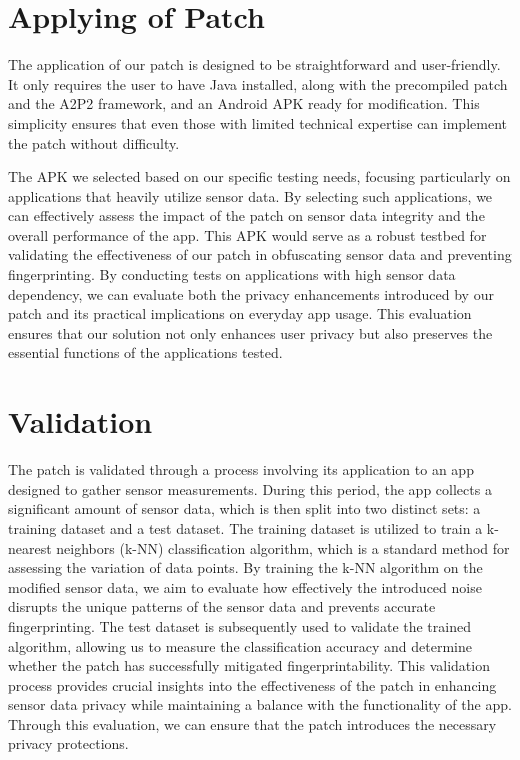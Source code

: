 \documentclass[11pt,
  oneside,openany,    %
]{scrreprt}
\begin{document}
\chapter{Applying of Patch}
\label{chap:applying}
The application of our patch is designed to be straightforward and user-friendly.
It only requires the user to have Java installed, along with the precompiled patch and the A2P2 framework, and an Android APK ready for modification.
This simplicity ensures that even those with limited technical expertise can implement the patch without difficulty.

The APK we selected based on our specific testing needs, focusing particularly on applications that heavily utilize sensor data.
By selecting such applications, we can effectively assess the impact of the patch on sensor data integrity and the overall performance of the app.
This APK would serve as a robust testbed for validating the effectiveness of our patch in obfuscating sensor data and preventing fingerprinting.
By conducting tests on applications with high sensor data dependency, we can evaluate both the privacy enhancements introduced by our patch and its practical implications on everyday app usage.
This evaluation ensures that our solution not only enhances user privacy but also preserves the essential functions of the applications tested.

\chapter{Validation}
\label{chap:validaton}
The patch is validated through a process involving its application to an app designed to gather sensor measurements.
During this period, the app collects a significant amount of sensor data, which is then split into two distinct sets: a training dataset and a test dataset.
The training dataset is utilized to train a k-nearest neighbors (k-NN) classification algorithm, which is a standard method for assessing the variation of data points.
By training the k-NN algorithm on the modified sensor data, we aim to evaluate how effectively the introduced noise disrupts the unique patterns of the sensor data and prevents accurate fingerprinting.
The test dataset is subsequently used to validate the trained algorithm, allowing us to measure the classification accuracy and determine whether the patch has successfully mitigated fingerprintability.
This validation process provides crucial insights into the effectiveness of the patch in enhancing sensor data privacy while maintaining a balance with the functionality of the app.
Through this evaluation, we can ensure that the patch introduces the necessary privacy protections.
\end{document}

